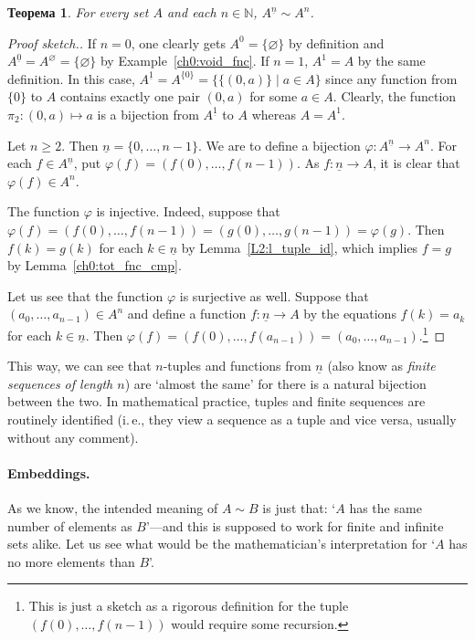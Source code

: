 \documentclass[12pt,notitlepage]{article}
\theoremstyle{plain}
\newtheorem{thm}{Теорема}[section]
\theoremstyle{definition}
\theoremstyle{plain}
\newcommand{\N}{\mathbb{N}}
\newcommand{\void}{\varnothing}
\renewcommand{\phi}{\varphi}
\newcommand{\ul}[1]{\underline{#1}}
\newcommand{\1}{\mathbf{1}}
\newcommand{\0}{\mathbf{0}}
\newcommand{\mcomm}[1]{}
\begin{document}
\mcomm{This easy theorem proves handy when formalizing combinatorial arguments; it is thus unwise to skip it.}
\begin{thm}\label{L9:t_tuples}
	For every set $A$ and each $n \in \N$, $A^{\ul{n}} \sim A^n$.
\end{thm}
\begin{proof}[Proof sketch.]
	If $n = 0$, one clearly gets $A^0 = \{ \void \}$ by definition and $A^{\ul{0}} = A^\void = \{ \void \}$ by Example~\ref{ch0:void_fnc}. If $n = 1$, $A^1 = A$ by the same definition. In this case, $A^{\ul{1}} = A^{\{0\}} = \{ \{ (0, a) \} \mid a \in A\}$ since any function from $\{ 0 \}$ to $A$ contains exactly one pair $(0, a)$ for some $a \in A$. Clearly, the function $\pi_2 \colon (0, a) \mapsto a$ is a bijection from $A^{\ul{1}}$ to $A$ whereas $A = A^1$.
	
	Let $n \ge 2$. Then $\ul{n} = \{0, \ldots, n-1 \}$. We are to define a bijection $\phi \colon A^{\ul{n}} \to A^n$. For each $f \in A^{\ul{n}}$, put $\phi(f) = (f(0), \ldots, f(n - 1))$. As $f\colon \ul{n} \to A$, it is clear that $\phi(f) \in A^n$. 
	
	The function $\phi$ is injective. Indeed, suppose that $\phi(f) = (f(0), \ldots, f(n - 1)) = (g(0), \ldots, g(n - 1)) = \phi(g)$. Then $f(k) = g(k)$ for each $k \in \ul{n}$ by Lemma~\ref{L2:l_tuple_id}, which implies $f = g$ by Lemma~\ref{ch0:tot_fnc_cmp}.
	
	Let us see that the function $\phi$ is surjective as well. Suppose that $(a_0, \ldots, a_{n-1}) \in A^n$ and define a function $f\colon \ul{n} \to A$ by the equations $f(k) = a_k$ for each $k \in \ul{n}$. Then $\phi(f) = (f(0), \ldots, f(a_{n-1})) = (a_0, \ldots, a_{n-1})$.\footnote{This is just a sketch as a rigorous definition for the tuple $(f(0),\ldots,f(n-1))$ would require some recursion.}
\end{proof}

This way, we can see that $n$-tuples and functions from $\ul{n}$ (also know as \emph{finite sequences of length $n$}) are `almost the same' for there is a natural bijection between the two. In mathematical practice, tuples and finite sequences are routinely identified (i.\,e., they view a sequence as a tuple and vice versa, usually without any comment).

\paragraph{Embeddings.} As we know, the intended meaning of $A \sim B$ is just that: `$A$ has the same number of elements as $B$'---and this is supposed to work for finite and infinite sets alike. Let us see what would be the mathematician's interpretation for `$A$ has no more elements than $B$'.
\end{document}
